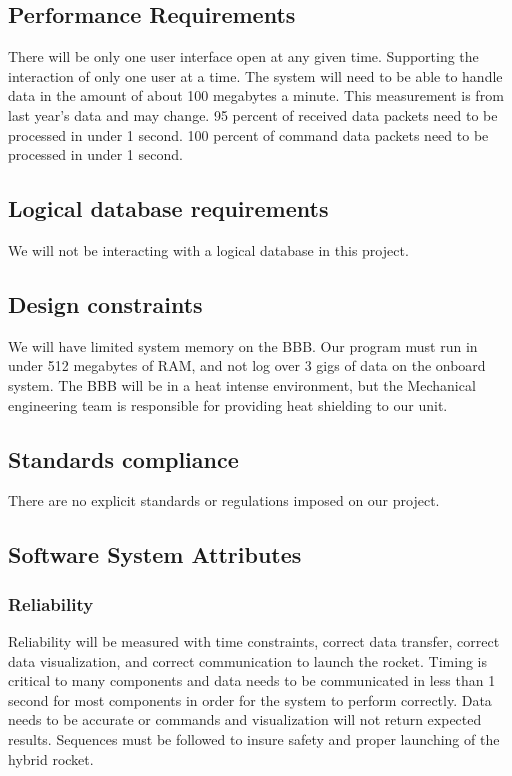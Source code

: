\documentclass[10pt,draftclsnofoot,onecolumn,retainorgcmds]{IEEEtran}
\begin{document}
\subsection{ Performance Requirements}
There will be only one user interface open at any given time. Supporting the interaction of only one user at a time. The system will need to be able to handle data in the amount of about 100 megabytes a minute. This measurement is from last year's data and may change. 95 percent of received data packets need to be processed in under 1 second. 100 percent of command data packets need to be processed in under 1 second.

\subsection{Logical database requirements}
We will not be interacting with a logical database in this project.

\subsection{Design constraints}
We will have limited system memory on the BBB. Our program must run in under 512 megabytes of RAM, and not log over 3 gigs of data on the onboard system. The BBB will be in a heat intense environment, but the Mechanical engineering team is responsible for providing heat shielding to our unit.

\subsection{Standards compliance}
There are no explicit standards or regulations imposed on our project.

\subsection{Software System Attributes}
\subsubsection{Reliability} Reliability will be measured with time constraints, correct data transfer, correct data visualization, and correct communication to launch the rocket. Timing is critical to many components and data needs to be communicated in less than 1 second for most components in order for the system to perform correctly. Data needs to be accurate or commands and visualization will not return expected results. Sequences must be followed to insure safety and proper launching of the hybrid rocket.
\end{document}
